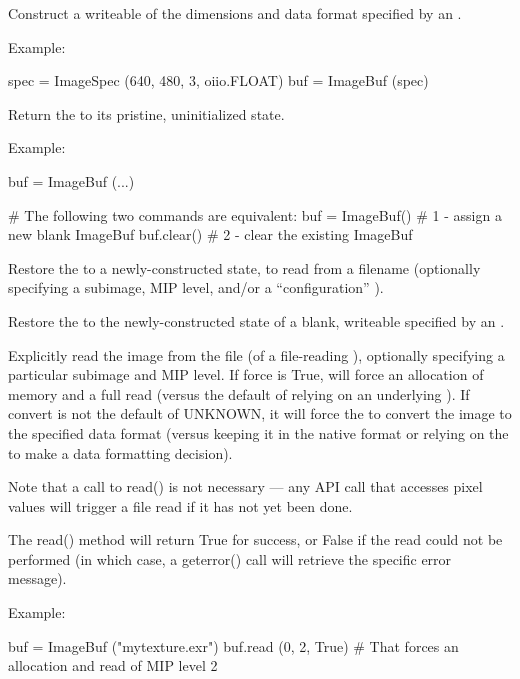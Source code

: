 Construct a writeable \ImageBuf of the dimensions and data format specified
by an \ImageSpec.

\noindent Example:
\begin{code}
    spec = ImageSpec (640, 480, 3, oiio.FLOAT)
    buf = ImageBuf (spec)
\end{code}
\apiend

Return the \ImageBuf to its pristine, uninitialized state.

\noindent Example:
\begin{code}
    buf = ImageBuf (...)

    # The following two commands are equivalent:
    buf = ImageBuf()     # 1 - assign a new blank ImageBuf
    buf.clear()          # 2 - clear the existing ImageBuf
\end{code}
\apiend

Restore the \ImageBuf to a newly-constructed state, to read from
a filename (optionally specifying a subimage, MIP level, and/or 
a ``configuration'' \ImageSpec).
\apiend

Restore the \ImageBuf to the newly-constructed state of a blank, writeable
\ImageBuf specified by an \ImageSpec.
\apiend

Explicitly read the image from the file (of a file-reading \ImageBuf), optionally
specifying a particular subimage and MIP level.  If {\cf force} is {\cf True},
will force an allocation of memory and a full read (versus the default of
relying on an underlying \ImageCache).  If {\cf convert} is not
the default of {\cf UNKNOWN}, it will force the \ImageBuf to convert the
image to the specified data format (versus keeping it in the native 
format or relying on the \ImageCache to make a data formatting decision).

Note that a call to {\cf read()} is not necessary --- any \ImageBuf API call
that accesses pixel values will trigger a file read if it has not yet been
done.

The {\cf read()} method will return {\cf True} for success, or {\cf False}
if the read could not be performed (in which case, a {\cf geterror()} call
will retrieve the specific error message).

\noindent Example:
\begin{code}
    buf = ImageBuf ("mytexture.exr")
    buf.read (0, 2, True)
    # That forces an allocation and read of MIP level 2
\end{code}
\apiend

